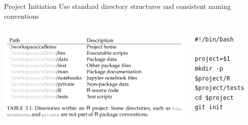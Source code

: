 \documentclass{beamer}
\begin{document}
%
%
%





\begin{frame}[fragile]{Project Initiation}
Use standard directory structures and consistent naming conventions

\begin{columns}
\begin{column}{.5\textwidth}
\includegraphics[width=\linewidth]{images/directory_structure}
\end{column}

\begin{column}{.5\textwidth}
\begin{lstlisting}[style=custombash]
#!/bin/bash

project=$1
mkdir -p $project/R $project/tests
cd $project
git init
\end{lstlisting}
\end{column}
\end{columns}
\end{frame}
\end{document}
